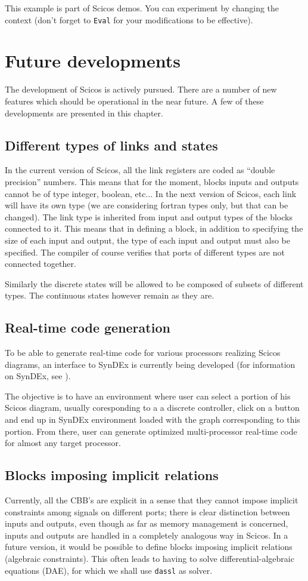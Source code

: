 \documentclass{book}
\begin{document}
This example is part of Scicos demos. You can experiment by changing
the context (don't forget to {\tt Eval} for your modifications to be
effective). 


\chapter{Future developments}
The development of Scicos is actively pursued. There are a number of
new features which should be operational in the near future. A few of
these developments are presented in this chapter.



\section{Different types of links and states}
In the current version of Scicos, all the link registers are coded
as ``double precision'' numbers. This means that for the moment, blocks
inputs and outputs cannot be of type integer, boolean, etc... In the
next version of Scicos, each link will have its own type 
(we are considering fortran types only, but that can be
changed). The link type is inherited from input and output types of
the blocks connected to it. This means that in defining
a block, in addition to specifying the size of each input and
output, the type of each input and output must also be specified.
The compiler of course verifies that ports of different types
are not connected together.

Similarly the discrete states will be allowed to be composed of
subsets of different types. The continuous states however
remain as they are.


\section{Real-time code generation}
To be able to generate real-time code for various processors
realizing Scicos diagrams, an interface to SynDEx is currently
being developed (for information on SynDEx, see
\cite{syndex1,syndex2}).

The objective is to have an environment where user can select
a portion of his Scicos diagram, usually coresponding to a
a discrete controller, click on a button and end up in SynDEx
environment loaded with the graph  corresponding
to this portion. From there,
user can generate optimized multi-processor real-time code
for almost any target processor.

\section{Blocks imposing implicit relations}
Currently, all the CBB's are explicit in a sense that they cannot
impose implicit constraints among signals on different ports;
there is clear distinction between inputs and outputs, even though
as far as memory management is concerned,   
inputs and outputs are handled in a completely analogous way in
Scicos. In a future version, it would be possible to define blocks
imposing implicit relations (algebraic constraints). This often leads
to having to solve differential-algebraic equations (DAE), for which we
shall use {\tt dassl} \cite{dassl1,dassl2} as solver. 
\end{document}

